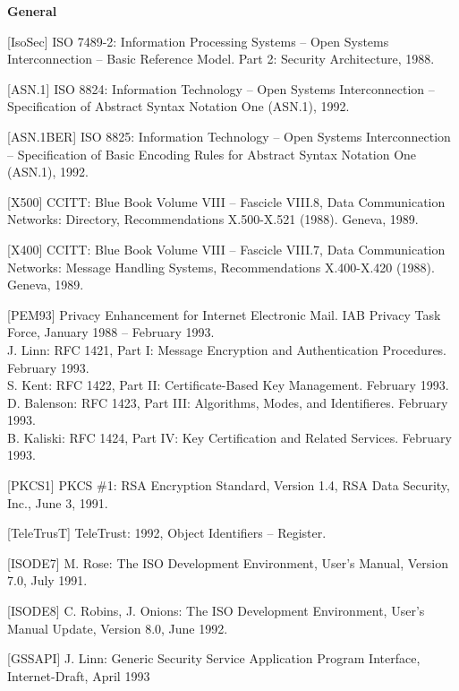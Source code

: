 {\bf General}
{\small
\begin{description}
\item{[IsoSec]}
ISO 7489-2:
Information Processing Systems --
Open Systems Interconnection --
Basic Reference Model.
Part 2: Security Architecture, 1988.

\item{[ASN.1]}
ISO 8824:
Information Technology --
Open Systems Interconnection --
Specification of Abstract Syntax Notation One (ASN.1), 1992.

\item{[ASN.1BER]}
ISO 8825:
Information Technology --
Open Systems Interconnection --
Specification of Basic Encoding Rules for Abstract Syntax Notation One (ASN.1), 1992.

\item{[X500]}
CCITT: Blue Book Volume VIII -- Fascicle VIII.8,
Data Communication Networks:
Directory, Recommendations X.500-X.521 (1988).
Geneva, 1989.

\item{[X400]}
CCITT: Blue Book Volume VIII -- Fascicle VIII.7,
Data Communication Networks:
Message Handling Systems,
Recommendations X.400-X.420 (1988).
Geneva, 1989.

\item{[PEM93]}
Privacy Enhancement for Internet Electronic Mail.
IAB Privacy Task Force, January 1988 -- February 1993. \\
J. Linn:
RFC 1421, Part I: Message Encryption and Authentication Procedures.
February 1993. \\
S. Kent:
RFC 1422, Part II: Certificate-Based Key Management.
February 1993. \\
D. Balenson: 
RFC 1423, Part III: Algorithms, Modes, and Identifieres.
February 1993. \\
B. Kaliski:
RFC 1424, Part IV: Key Certification and Related Services.
February 1993.

\item{[PKCS1]}
PKCS \#1: RSA Encryption Standard, Version 1.4,
RSA Data Security, Inc., June 3, 1991.

\item{[TeleTrusT]}
TeleTrust: 1992, Object Identifiers -- Register.

\item{[ISODE7]}
M. Rose: The ISO Development Environment, User's Manual, Version 7.0, July 1991.

\item{[ISODE8]}
C. Robins, J. Onions: The ISO Development Environment, User's Manual Update, Version 8.0, June 1992.

\item{[GSSAPI]}
J. Linn: Generic Security Service Application Program Interface, Internet-Draft, April 1993
\end{description}
}
